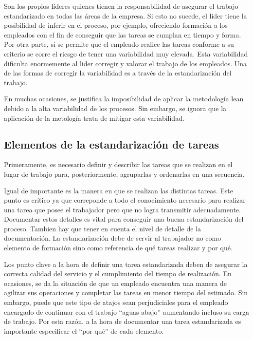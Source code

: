 Son los propios líderes quienes tienen la responsabilidad de asegurar el trabajo estandarizado en todas las áreas de la empresa. Si esto no sucede, el líder tiene la posibilidad de inferir en el proceso, por ejemplo, ofreciendo formación a los empleados con el fin de conseguir que las tareas se cumplan en tiempo y forma. Por otra parte, si se permite que el empleado realice las tareas conforme a su criterio se corre el riesgo de tener una variabilidad muy elevada. Esta variabilidad dificulta enormemente al lider corregir y valorar el trabajo de los empleados. Una de las formas de corregir la variabilidad es a través de la estandarización del trabajo.

En muchas ocasiones, se justifica la imposibilidad de aplicar la metodología lean debido a la alta variabilidad de los procesos. Sin embargo, se ignora que la aplicación de la metología trata de mitigar esta variabilidad.

\subsection{Elementos de la estandarización de tareas}

Primeramente, es necesario definir y describir las tareas que se realizan en el lugar de trabajo para, posteriormente, agruparlas y ordenarlas en una secuencia.

Igual de importante es la manera en que se realizan las distintas tareas.
Este punto es crítico ya que correponde a todo el conocimiento necesario para realizar una tarea que posee el trabajador pero que no logra transmitir adecuadamente. Documentar estos detalles es vital para conseguir una buena estandarización del proceso.
Tambien hay que tener en cuenta el nivel de detalle de la documentación.
La estandarización debe de servir al trabajador no como elemento de formación sino como referencia de qué tareas realizar y por qué.

Los punto clave a la hora de definir una tarea estandarizada deben de asegurar la correcta calidad del servicio y el cumplimiento del tiempo de realización.
En ocasiones, se da la situación de que un empleado encuentra una manera de agilizar sus operaciones y completar las tareas en menor tiempo del estimado.
Sin embargo, puede que este tipo de atajos sean perjudiciales para el empleado encargado de continuar con el trabajo ``aguas abajo'' aumentando incluso su carga de trabajo. Por esta razón, a la hora de documentar una tarea estandarizada es importante especificar el ``por qué'' de cada elemento.

